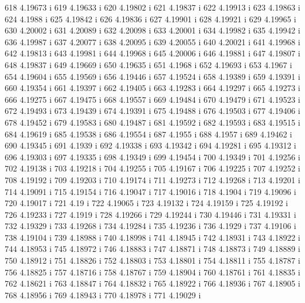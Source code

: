  618  4.19673  i
 619  4.19633  i
 620  4.19802  i
 621  4.19837  i
 622  4.19913  i
 623  4.19863  i
 624  4.1988  i
 625  4.19842  i
 626  4.19836  i
 627  4.19901  i
 628  4.19921  i
 629  4.19965  i
 630  4.20002  i
 631  4.20089  i
 632  4.20098  i
 633  4.20001  i
 634  4.19982  i
 635  4.19942  i
 636  4.19987  i
 637  4.20077  i
 638  4.20095  i
 639  4.20055  i
 640  4.20021  i
 641  4.19968  i
 642  4.19813  i
 643  4.19981  i
 644  4.19968  i
 645  4.20006  i
 646  4.19881  i
 647  4.19807  i
 648  4.19837  i
 649  4.19669  i
 650  4.19635  i
 651  4.1968  i
 652  4.19693  i
 653  4.1967  i
 654  4.19604  i
 655  4.19569  i
 656  4.19446  i
 657  4.19524  i
 658  4.19389  i
 659  4.19391  i
 660  4.19354  i
 661  4.19397  i
 662  4.19405  i
 663  4.19283  i
 664  4.19297  i
 665  4.19273  i
 666  4.19275  i
 667  4.19475  i
 668  4.19557  i
 669  4.19484  i
 670  4.19479  i
 671  4.19523  i
 672  4.19493  i
 673  4.19439  i
 674  4.19391  i
 675  4.19488  i
 676  4.19503  i
 677  4.19406  i
 678  4.19452  i
 679  4.19583  i
 680  4.19487  i
 681  4.19592  i
 682  4.19593  i
 683  4.19515  i
 684  4.19619  i
 685  4.19538  i
 686  4.19554  i
 687  4.1955  i
 688  4.1957  i
 689  4.19462  i
 690  4.19345  i
 691  4.1939  i
 692  4.19338  i
 693  4.19342  i
 694  4.19281  i
 695  4.19312  i
 696  4.19303  i
 697  4.19335  i
 698  4.19349  i
 699  4.19454  i
 700  4.19349  i
 701  4.19256  i
 702  4.19138  i
 703  4.19218  i
 704  4.19255  i
 705  4.19167  i
 706  4.19225  i
 707  4.19252  i
 708  4.19192  i
 709  4.19203  i
 710  4.19174  i
 711  4.19273  i
 712  4.19268  i
 713  4.19201  i
 714  4.19091  i
 715  4.19154  i
 716  4.19047  i
 717  4.19016  i
 718  4.1904  i
 719  4.19096  i
 720  4.19017  i
 721  4.19  i
 722  4.19065  i
 723  4.19132  i
 724  4.19159  i
 725  4.19192  i
 726  4.19233  i
 727  4.1919  i
 728  4.19266  i
 729  4.19244  i
 730  4.19446  i
 731  4.19331  i
 732  4.19329  i
 733  4.19268  i
 734  4.19284  i
 735  4.19236  i
 736  4.1929  i
 737  4.19106  i
 738  4.19104  i
 739  4.18988  i
 740  4.18998  i
 741  4.18945  i
 742  4.18931  i
 743  4.18922  i
 744  4.18953  i
 745  4.18972  i
 746  4.18883  i
 747  4.18871  i
 748  4.18873  i
 749  4.18889  i
 750  4.18912  i
 751  4.18826  i
 752  4.18803  i
 753  4.18801  i
 754  4.18811  i
 755  4.18787  i
 756  4.18825  i
 757  4.18716  i
 758  4.18767  i
 759  4.18904  i
 760  4.18761  i
 761  4.18835  i
 762  4.18621  i
 763  4.18847  i
 764  4.18832  i
 765  4.18922  i
 766  4.18936  i
 767  4.18905  i
 768  4.18956  i
 769  4.18943  i
 770  4.18978  i
 771  4.19029  i
